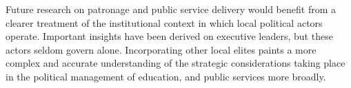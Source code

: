 \documentclass[12pt,a4paper]{article}
\newcommand{\blue}{\textcolor{blue}}
\begin{document}
Future research on patronage and public service delivery would benefit from a clearer treatment of the institutional context in which local political actors operate. Important insights have been derived on executive leaders, but these actors seldom govern alone. Incorporating other local elites paints a more complex and accurate understanding of the strategic considerations taking place in the political management of education, and public services more broadly.











\end{document}
